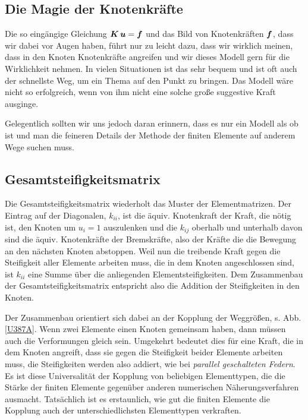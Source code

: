 {\textcolor{sectionTitleBlue}{\section{Die Magie der Knotenkr\"{a}fte}}}
Die so eing\"{a}ngige Gleichung $\mbox{\boldmath $K$}\,\mbox{\boldmath $u$} = \mbox{\boldmath $f$} $ und das Bild von Knotenkr\"{a}ften $\mbox{\boldmath $f$}$, dass wir dabei vor Augen haben, f\"{u}hrt nur zu leicht dazu, dass wir wirklich meinen, dass in den Knoten Knotenkr\"{a}fte angreifen und wir dieses Modell gern f\"{u}r die Wirklichkeit nehmen. In vielen Situationen ist das sehr bequem und ist oft auch der schnellste Weg, um ein Thema auf den Punkt zu bringen. Das Modell w\"{a}re nicht so erfolgreich, wenn von ihm nicht eine solche gro{\ss}e suggestive Kraft ausginge.

Gelegentlich sollten wir uns jedoch daran erinnern, dass es nur ein Modell \glq als ob\grq{} ist und man die feineren Details der Methode der finiten Elemente auf anderem Wege suchen muss.



{\textcolor{sectionTitleBlue}{\section{Gesamtsteifigkeitsmatrix}}}
Die Gesamtsteifigkeitsmatrix wiederholt das Muster der Elementmatrizen. Der Eintrag auf der Diagonalen, $k_{ii} $, ist die \"{a}quiv. Knotenkraft der Kraft, die n\"{o}tig ist, den Knoten um $u_i = 1 $ auszulenken und die $k_{ij} $ oberhalb und unterhalb davon sind die \"{a}quiv. Knotenkr\"{a}fte der Bremskr\"{a}fte, also der Kr\"{a}fte die die Bewegung an den n\"{a}chsten Knoten abstoppen. Weil nun die treibende Kraft gegen die Steifigkeit aller Elemente arbeiten muss, die in dem Knoten angeschlossen sind, ist $k_{ii} $ eine Summe \"{u}ber die anliegenden Elementsteifigkeiten. Dem Zusammenbau der Gesamtsteifigkeitsmatrix entspricht also die Addition der Steifigkeiten in den Knoten.

Der Zusammenbau orientiert sich dabei an der Kopplung der Weggr\"{o}{\ss}en, s. Abb. \ref{U387A}. Wenn zwei Elemente einen Knoten gemeinsam haben, dann m\"{u}ssen auch die Verformungen gleich sein. Umgekehrt bedeutet dies f\"{u}r eine Kraft, die in dem Knoten angreift, dass sie gegen die Steifigkeit beider Elemente arbeiten muss, die Steifigkeiten werden also addiert, wie bei {\em parallel geschalteten Federn\/}. Es ist diese Universalit\"{a}t der Kopplung von beliebigen Elementtypen, die die St\"{a}rke der finiten Elemente gegen\"{u}ber anderen numerischen N\"{a}herungsverfahren ausmacht. Tats\"{a}chlich ist es erstaunlich, wie gut die finiten Elemente die Kopplung auch der unterschiedlichsten Elementtypen verkraften.

